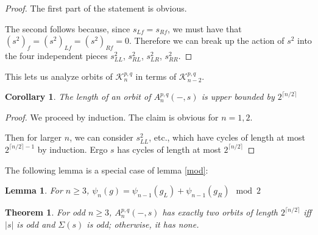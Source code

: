 \documentclass[11pt]{article}
\theoremstyle{plain}
\newtheorem{theorem}{Theorem}
\newtheorem{lemma}{Lemma}
\newtheorem{corollary}{Corollary}
\theoremstyle{definition}
\begin{document}
\begin{proof}

    The first part of the statement is obvious.

    The second follows because, since $s_{Lf} = s_{Rf}$, we must have that $(s^2)_f = (s^2)_{Lf} = (s^2)_{Rf} = 0$. Therefore we can break up the action of $s^2$ into the four independent pieces $s^2_{LL}$, $s^2_{RL}$, $s^2_{LR}$, $s^2_{RR}$.  
\end{proof}


This lets us analyze orbits of $\mathcal{K}_n^{p,q}$ in terms of $\mathcal{K}_{n-2}^{p,q}$.


\begin{corollary}
    

The length of an orbit of $A_n^{p,q}(-,s)$ is upper bounded by $ 2^{\lceil n/2\rceil}$
    
\end{corollary}

\begin{proof}

We proceed by induction. The claim is obvious for $n = 1,2$. 

Then for larger $n$, we can consider $s^2_{LL}$, etc., which have cycles of length at most  $ 2^{\lceil n/2\rceil -1}$ by induction. Ergo $s$ has cycles of length at most $ 2^{\lceil n/2\rceil}$
    
\end{proof}


The following lemma is a special case of lemma \ref{mod}: 
\begin{lemma}
    For $n \geq 3$, $\psi_n(g) = \psi_{n-1}(g_L) + \psi_{n-1}(g_R) \mod 2$
\end{lemma}

\begin{theorem}
    For odd $n \geq 3$, $A_n^{p,q}(-,s)$ has exactly two orbits of length $2^{\lceil n/2 \rceil}$ iff $|s|$ is odd and $\Sigma(s)$ is odd; otherwise, it has none.
\end{theorem}
\end{document}
